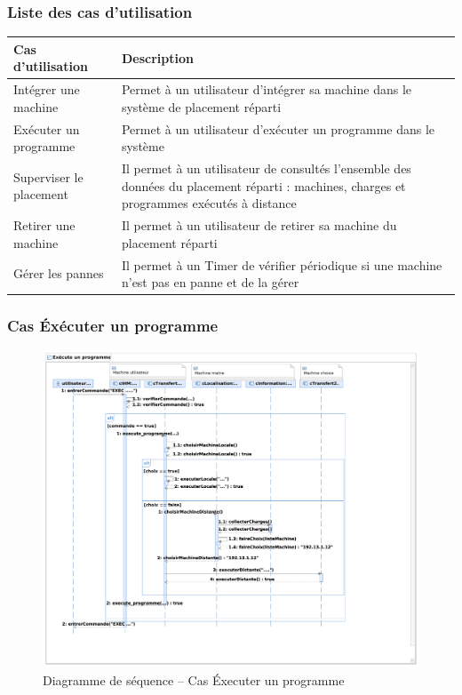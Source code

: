   \subsubsection{Liste des cas d'utilisation}
    \begin{tabular}{|l|p{7cm}|}
      \hline
        \bf Cas d'utilisation &
        \bf Description \\
      \hline
        Intégrer une machine &
        Permet à un utilisateur d'intégrer sa machine dans le système
        de placement réparti \\
      \hline
        Exécuter un programme &
        Permet à un utilisateur d'exécuter un programme dans le
        système \\
      \hline
        Superviser le placement &
        Il permet à un utilisateur de consultés l'ensemble des données
        du placement réparti : machines, charges et programmes exécutés
        à distance \\
      \hline
        Retirer une machine &
        Il permet à un utilisateur de retirer sa machine du placement 
        réparti \\
      \hline
        Gérer les pannes &
        Il permet à un Timer de vérifier périodique si une machine n'est
        pas en panne et de la gérer \\
      \hline
    \end{tabular}
  \newpage

  \subsubsection{Cas Éxécuter un programme}

    \begin{figure}[h!]
      \centering
      \includegraphics[width=\textwidth]{img/analyse_DSCexecprog.pdf}
      \caption{Diagramme de séquence -- Cas Éxecuter un programme}
    \end{figure}

